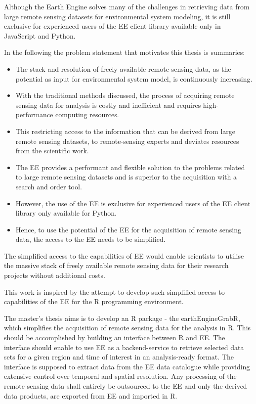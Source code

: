 Although the Earth Engine solves many of the challenges in retrieving data from large remote sensing datasets for environmental system modeling, it is still exclusive for experienced users of the EE client library available only in JavaScript and Python.


In the following the problem statement that motivates this thesis is summaries:

\begin{itemize}
	
	\item The stack and resolution of freely available remote sensing data, as the potential as input for environmental system model, is continuously increasing.
	\item With the traditional methods discussed, the process of acquiring remote sensing data for analysis is costly and inefficient and requires high-performance computing resources.
	\item This restricting access to the information that can be derived from large remote sensing datasets, to remote-sensing experts and deviates resources from the scientific work.
	\item The EE provides a performant and flexible solution to the problems related to large remote sensing datasets and is superior to the acquisition with a search and order tool.
	\item However, the use of the EE is exclusive for experienced users of the EE client library only available for Python.
	\item Hence, to use the potential of the EE for the acquisition of remote sensing data, the access to the EE needs to be simplified.
	
\end{itemize}

The simplified access to the capabilities of EE would enable scientists to utilise the massive stack of freely available remote sensing data for their research projects without additional costs.

This work is inspired by the attempt to develop such simplified access to capabilities of the EE for the R programming environment.

The master's thesis aims is to develop an R package - the earthEngineGrabR, which simplifies the acquisition of remote sensing data for the analysis in R. This should be accomplished by building an interface between R and EE.
The interface should enable to use EE as a backend-service to retrieve selected data sets for a given region and time of interest in an analysis-ready format. The interface is supposed to extract data from the EE data catalogue while providing extensive control over temporal and spatial resolution. 
Any processing of the remote sensing data shall entirely be outsourced to the EE and only the derived data products, are exported from EE and imported in R. 

